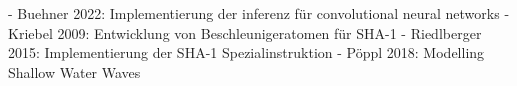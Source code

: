 

- Buehner 2022: Implementierung der inferenz für convolutional neural networks
- Kriebel 2009: Entwicklung von Beschleunigeratomen für SHA-1
- Riedlberger 2015: Implementierung der SHA-1 Spezialinstruktion
- Pöppl 2018: Modelling Shallow Water Waves